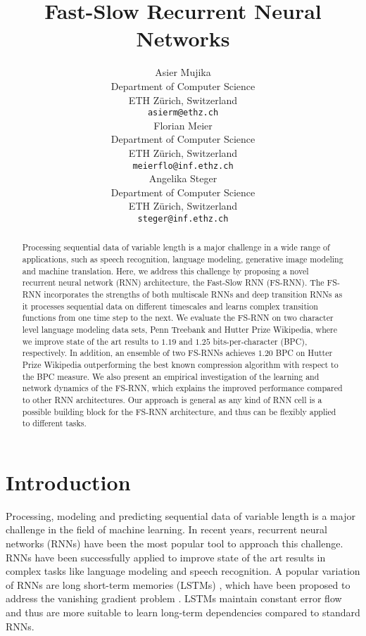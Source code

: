\documentclass{article}
\title{Fast-Slow Recurrent Neural Networks}
\author{
  Asier Mujika\\
  Department of Computer Science\\
  ETH Zürich, Switzerland\\
  \texttt{asierm@ethz.ch} \\
  \And
  Florian Meier \\
  Department of Computer Science\\
  ETH Zürich, Switzerland\\
  \texttt{meierflo@inf.ethz.ch} \\
    \And
  Angelika Steger \\
  Department of Computer Science\\
  ETH Zürich, Switzerland\\
  \texttt{steger@inf.ethz.ch} \\
}
\begin{document}
\maketitle

\begin{abstract}



Processing sequential data of variable length is a major challenge in a wide range of applications, such as speech recognition, language modeling, generative image modeling and machine translation.
Here, we address this challenge by proposing a novel recurrent neural network (RNN) architecture, the Fast-Slow RNN (FS-RNN). The FS-RNN incorporates the strengths of both  multiscale RNNs and deep transition RNNs as it processes sequential data on different timescales  and learns complex transition functions from one time step to the next.  
We evaluate the FS-RNN on two character level language modeling data sets, Penn Treebank and Hutter Prize Wikipedia, where  we improve state of the art results to  $1.19$ and $1.25$ bits-per-character (BPC), respectively. In addition, an ensemble of two FS-RNNs achieves $1.20$ BPC on  Hutter Prize Wikipedia outperforming  the best known compression algorithm with respect to the BPC measure. We also present an empirical investigation of the learning and network dynamics of the FS-RNN, which explains the improved performance compared to other RNN architectures. Our approach is general as any kind of RNN cell is a possible building block for the FS-RNN architecture,  and thus can be flexibly applied to different tasks.
\end{abstract}



\section{Introduction}\label{sec:Introduction}
Processing, modeling and predicting sequential data of variable  length is a major challenge in the field of machine learning. In recent years, recurrent neural networks (RNNs) \cite{rumelhart1988learning,robinson1987utility, werbos1988generalization, williams1989complexity} have been the most popular tool to approach this challenge. RNNs have been successfully applied to improve state of the art results in complex tasks like language modeling and speech recognition. A popular variation of RNNs are long short-term memories (LSTMs) \cite{hochreiter1997long}, which have been proposed to address the vanishing gradient problem \cite{hochreiter1991untersuchungen, bengio1994learning, hochreiter1998vanishing}. LSTMs maintain constant error flow and thus are more suitable to learn long-term dependencies compared to standard RNNs.
\end{document}
